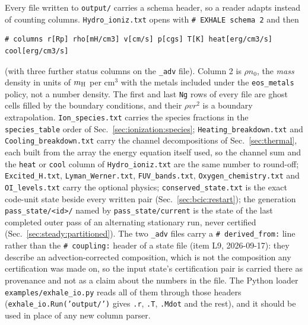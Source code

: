 Every file written to \texttt{output/} carries a schema header, so a reader
adapts instead of counting columns. \texttt{Hydro\_ioniz.txt} opens with
\texttt{\# EXHALE schema 2} and then
\begin{verbatim}
# columns r[Rp] rho[mH/cm3] v[cm/s] p[cgs] T[K] heat[erg/cm3/s] cool[erg/cm3/s]
\end{verbatim}
(with three further status columns on the \texttt{\_adv} file). Column 2 is
$\rho n_0$, the \emph{mass} density in units of $m_{\rm H}$ per cm$^{3}$
with the metals included under the \texttt{eos\_metals} policy, not a number
density. The first and last \texttt{Ng} rows of every file are ghost cells
filled by the boundary conditions, and their $\rho v r^{2}$ is a boundary
extrapolation. \texttt{Ion\_species.txt} carries the species fractions in the
\texttt{species\_table} order of Sec.~\ref{sec:ionization:species};
\texttt{Heating\_breakdown.txt} and \texttt{Cooling\_breakdown.txt} carry the
channel decompositions of Sec.~\ref{sec:thermal}, each built from the array the
energy equation itself used, so the channel sum and the \texttt{heat} or
\texttt{cool} column of \texttt{Hydro\_ioniz.txt} are the same number to
round-off; \texttt{Excited\_H.txt}, \texttt{Lyman\_Werner.txt},
\texttt{FUV\_bands.txt}, \texttt{Oxygen\_chemistry.txt} and
\texttt{OI\_levels.txt} carry the optional physics;
\texttt{conserved\_state.txt} is the exact code-unit state beside every
written pair (Sec.~\ref{sec:bcic:restart});
the generation \texttt{pass\_state/<id>/} named by \texttt{pass\_state/current}
is the state of the last completed outer pass of an alternating stationary
run, never certified (Sec.~\ref{sec:steady:partitioned}). The two \texttt{\_adv} files carry a
\texttt{\# derived\_from:} line rather than the \texttt{\# coupling:} header
of a state file (item L9, 2026-09-17): they describe an advection-corrected
composition, which is not the composition any certification was made on, so the
input state's certification pair is carried there as provenance and not as a
claim about the numbers in the file. The Python loader
\texttt{examples/exhale\_io.py} reads all of them through those headers
(\texttt{exhale\_io.Run('output/')} gives \texttt{.r}, \texttt{.T},
\texttt{.Mdot} and the rest), and it should be used in place of any new
column parser.

